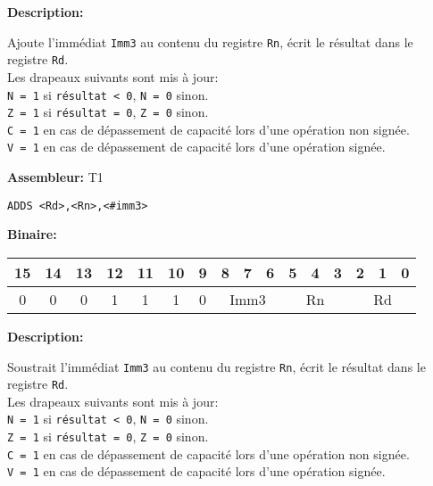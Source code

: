 \documentclass{article}
\begin{document}

    \textbf{Description: }

    Ajoute l'immédiat \texttt{Imm3} au contenu du registre \texttt{Rn}, écrit le résultat dans le registre \texttt{Rd}.\\
    Les drapeaux suivants sont mis à jour:\\
    \texttt{N = 1} si \texttt{résultat < 0}, \texttt{N = 0} sinon.\\
    \texttt{Z = 1} si \texttt{résultat = 0}, \texttt{Z = 0} sinon.\\
    \texttt{C = 1} en cas de dépassement de capacité lors d'une opération non signée.\\
    \texttt{V = 1} en cas de dépassement de capacité lors d'une opération signée.

    \textbf{Assembleur:} T1

    \begin{lstlisting}
ADDS <Rd>,<Rn>,<#imm3>
    \end{lstlisting}

    \textbf{Binaire:}

    \begin{tabular}{| c c c c c c c c c c c c c c c c |}
        \hline
        15 & 14 & 13 & \multicolumn{1}{|c}{12} & 11 & \multicolumn{1}{|c}{10} & \multicolumn{1}{|c}{9} & \multicolumn{1}{|c}{8} & 7 & 6 & \multicolumn{1}{|c}{5} & 4 & 3 & \multicolumn{1}{|c}{2} & 1 & 0 \\
        \hline
        0 & 0 & 0 & \multicolumn{1}{|c}{1} & 1 & \multicolumn{1}{|c}{1} & \multicolumn{1}{|c}{0} & \multicolumn{3}{|c|}{Imm3} & \multicolumn{3}{|c|}{Rn} & \multicolumn{3}{|c|}{Rd} \\
        \hline
    \end{tabular}



    \textbf{Description: }

    Soustrait l'immédiat \texttt{Imm3} au contenu du registre \texttt{Rn}, écrit le résultat dans le registre \texttt{Rd}.\\
    Les drapeaux suivants sont mis à jour:\\
    \texttt{N = 1} si \texttt{résultat < 0}, \texttt{N = 0} sinon.\\
    \texttt{Z = 1} si \texttt{résultat = 0}, \texttt{Z = 0} sinon.\\
    \texttt{C = 1} en cas de dépassement de capacité lors d'une opération non signée.\\
    \texttt{V = 1} en cas de dépassement de capacité lors d'une opération signée.
\end{document}
